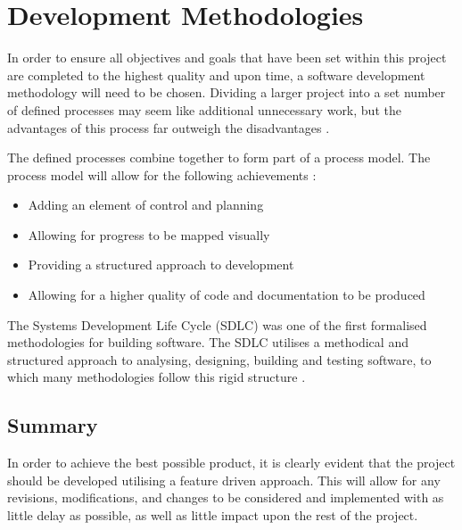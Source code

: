 \chapter{Development Methodologies}

In order to ensure all objectives and goals that have been set within this 
project are completed to the highest quality and upon time, a software 
development methodology will need to be chosen. Dividing a larger project into 
a set number of defined processes may seem like additional unnecessary work, 
but the advantages of this process far outweigh the disadvantages 
\citep{knott_dawson99}.

The defined processes combine together to form part of a process model. The 
process model will allow for the following achievements \citep{knott_dawson99}:

\begin{itemize}
  \item Adding an element of control and planning
  \item Allowing for progress to be mapped visually
  \item Providing a structured approach to development
  \item Allowing for a higher quality of code and documentation to be produced
\end{itemize}

The Systems Development Life Cycle (SDLC) was one of the first formalised 
methodologies for building software. The SDLC utilises a methodical and 
structured approach to analysing, designing, building and testing software, to 
which many methodologies follow this rigid structure \citep{elliott04}. 


\newpage



\newpage



\newpage



\newpage



\section{Summary}
In order to achieve the best possible product, it is clearly evident that the 
project should be developed utilising a feature driven approach. This will 
allow for any revisions, modifications, and changes to be considered and 
implemented with as little delay as possible, as well as little impact upon the
rest of the project.


